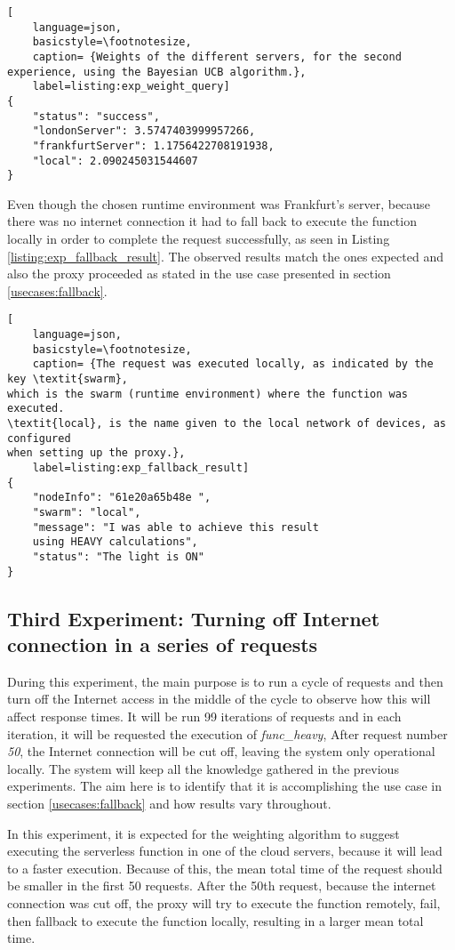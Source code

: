 \begin{lstlisting}[
    language=json,
    basicstyle=\footnotesize,
    caption= {Weights of the different servers, for the second experience, using the Bayesian UCB algorithm.},
    label=listing:exp_weight_query]
{
    "status": "success",
    "londonServer": 3.5747403999957266,
    "frankfurtServer": 1.1756422708191938,
    "local": 2.090245031544607
}
\end{lstlisting}

Even though the chosen runtime environment was Frankfurt's server, because there
was no internet connection it had to fall back to execute the function locally in
order to complete the request successfully, as seen in Listing
\ref{listing:exp_fallback_result}. The observed results match the ones expected
and also the proxy proceeded as stated in the use case presented in section \ref{usecases:fallback}.

\begin{lstlisting}[
    language=json,
    basicstyle=\footnotesize,
    caption= {The request was executed locally, as indicated by the key \textit{swarm},
which is the swarm (runtime environment) where the function was executed.
\textit{local}, is the name given to the local network of devices, as configured
when setting up the proxy.},
    label=listing:exp_fallback_result]
{
    "nodeInfo": "61e20a65b48e ",
    "swarm": "local",
    "message": "I was able to achieve this result 
    using HEAVY calculations",
    "status": "The light is ON"
}
\end{lstlisting}


\subsection{Third Experiment: Turning off Internet connection in a series of requests}
During this experiment, the main purpose is to run a cycle of requests and then
turn off the Internet access in the middle of the cycle to observe how this will
affect response times. It will be run 99 iterations of requests and in each
iteration, it will be requested the execution of \textit{func\_heavy}, After
request number \textit{50}, the Internet connection will be cut off, leaving the
system only operational locally. The system will keep all the knowledge gathered
in the previous experiments. The aim here is to identify that it is accomplishing
the use case in section \ref{usecases:fallback} and how results vary throughout.

In this experiment, it is expected for the weighting algorithm to suggest
executing the serverless function in one of the cloud servers, because it will
lead to a faster execution. Because of this, the mean total time of the request should
be smaller in the first 50 requests. After the 50th request, because the internet
connection was cut off, the proxy will try to execute the function remotely, fail,
then fallback to execute the function locally, resulting in a larger mean total
time. 

